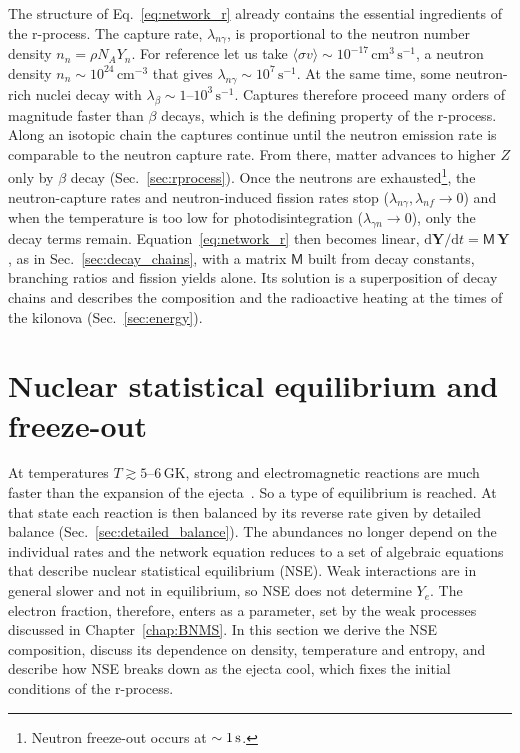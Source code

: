 The structure of Eq.~\ref{eq:network_r} already contains the essential ingredients of the r-process.
The capture rate, $\lambda_{n\gamma}$, is proportional to the neutron number density $n_n=\rho N_AY_n$.
For reference let us take $\langle\sigma v\rangle\sim10^{-17}\,\mathrm{cm^3\,s^{-1}}$, a neutron density $n_n\sim10^{24}\,\mathrm{cm^{-3}}$ that gives $\lambda_{n\gamma}\sim10^{7}\,\mathrm{s^{-1}}$.
At the same time, some neutron-rich nuclei decay with $\lambda_\beta\sim1$--$10^3\,\mathrm{s^{-1}}$.
Captures therefore proceed many orders of magnitude faster than $\beta$ decays, which is the defining property of the r-process.
Along an isotopic chain the captures continue until the neutron emission rate is comparable to the neutron capture rate.
From there, matter advances to higher $Z$ only by $\beta$ decay (Sec.~\ref{sec:rprocess}).
Once the neutrons are exhausted\footnote{Neutron freeze-out occurs at $\sim1\,\rm s$.}, the neutron-capture rates and neutron-induced fission rates stop ($\lambda_{n\gamma},\lambda_{nf}\to0$) and when the temperature is too low for photodisintegration ($\lambda_{\gamma n}\to0$), only the decay terms remain.
Equation~\ref{eq:network_r} then becomes linear, $\mathrm{d}\mathbf{Y}/\mathrm{d}t=\mathsf M\,\mathbf{Y}$, as in Sec.~\ref{sec:decay_chains}, with a matrix $\mathsf M$ built from decay constants, branching ratios and fission yields alone.
Its solution is a superposition of decay chains and describes the composition and the radioactive heating at the times of the kilonova (Sec.~\ref{sec:energy}).

\section{Nuclear statistical equilibrium and freeze-out}\label{sec:nse}

At temperatures $T\gtrsim5$--$6\,\mathrm{GK}$, strong and electromagnetic reactions are much faster than the expansion of the ejecta~\cite{reichert_nuclear_2023}.
So a type of equilibrium is reached.
At that state each reaction is then balanced by its reverse rate given by detailed balance (Sec.~\ref{sec:detailed_balance}). 
The abundances no longer depend on the individual rates and the network equation reduces to a set of algebraic equations that describe nuclear statistical equilibrium (NSE).
Weak interactions are in general slower and not in equilibrium, so NSE does not determine $Y_e$.
The electron fraction, therefore, enters as a parameter, set by the weak processes discussed in Chapter~\ref{chap:BNMS}.
In this section we derive the NSE composition, discuss its dependence on density, temperature and entropy, and describe how NSE breaks down as the ejecta cool, which fixes the initial conditions of the r-process.

